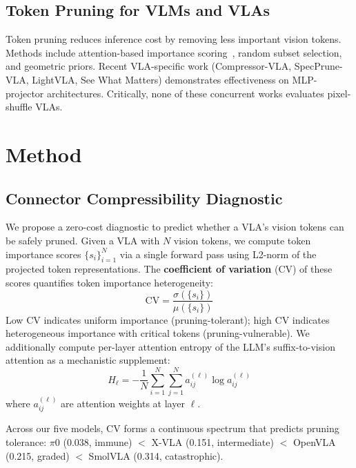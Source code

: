 \documentclass[letterpaper]{article}
\begin{document}
\subsection{Token Pruning for VLMs and VLAs}

Token pruning reduces inference cost by removing less important vision tokens.
Methods include attention-based importance scoring~\cite{chen2024image}, random subset selection, and geometric priors.
Recent VLA-specific work (Compressor-VLA, SpecPrune-VLA, LightVLA, See What Matters) demonstrates effectiveness on MLP-projector architectures.
Critically, none of these concurrent works evaluates pixel-shuffle VLAs.

\section{Method}
\label{sec:method}

\subsection{Connector Compressibility Diagnostic}
\label{sec:diagnostic}

We propose a zero-cost diagnostic to predict whether a VLA's vision tokens can be safely pruned.
Given a VLA with $N$ vision tokens, we compute token importance scores $\{s_i\}_{i=1}^{N}$ via a single forward pass using L2-norm of the projected token representations.
The \textbf{coefficient of variation} (CV) of these scores quantifies token importance heterogeneity:
\begin{equation}
    \text{CV} = \frac{\sigma(\{s_i\})}{\mu(\{s_i\})}
\end{equation}
Low CV indicates uniform importance (pruning-tolerant); high CV indicates heterogeneous importance with critical tokens (pruning-vulnerable).
We additionally compute per-layer attention entropy of the LLM's suffix-to-vision attention as a mechanistic supplement:
\begin{equation}
    H_\ell = -\frac{1}{N}\sum_{i=1}^{N} \sum_{j=1}^{N} a_{ij}^{(\ell)} \log a_{ij}^{(\ell)}
\end{equation}
where $a_{ij}^{(\ell)}$ are attention weights at layer $\ell$.

Across our five models, CV forms a continuous spectrum that predicts pruning tolerance:
$\pi$0 (0.038, immune) $<$ X-VLA (0.151, intermediate) $<$ OpenVLA (0.215, graded) $<$ SmolVLA (0.314, catastrophic).
\end{document}
